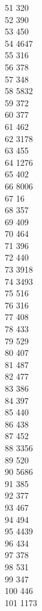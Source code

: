 { 51	320 \\
 52	390 \\
 53	450 \\
 54	4647 \\
 55	316 \\
 56	378 \\
 57	348 \\
 58	5832 \\
 59	372 \\
 60	377 \\
 61	462 \\
 62	3178 \\
 63	455 \\
 64	1276 \\
 65	402 \\
 66	8006 \\
 67	16 \\
 68	357 \\
 69	409 \\
 70	464 \\
 71	396 \\
 72	440 \\
 73	3918 \\
 74	3493 \\
 75	516 \\
 76	316 \\
 77	408 \\
 78	433 \\
 79	529 \\
 80	407 \\
 81	487 \\
 82	477 \\
 83	386 \\
 84	397 \\
 85	440 \\
 86	438 \\
 87	452 \\
 88	3356 \\
 89	520 \\
 90	5686 \\
 91	385 \\
 92	377 \\
 93	467 \\
 94	494 \\
 95	4439 \\
 96	434 \\
 97	378 \\
 98	531 \\
 99	347 \\
 100	446 \\
 101	1173 \\
}
